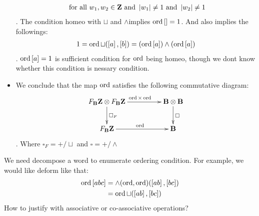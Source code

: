 \begin{itemize}
\begin{equation}
\begin{split}
			& \text{ for all }w_1,w_2\in {\mathbf{Z}}\text{ and }\left|{w_1}\right|\not=1 \text{ and }\left|{w_2}\right|\not=1 \\
	\end{split}\end{equation}
	. 
	The condition homeo with $\sqcup$ and $\wedge $implies $\operatorname{ord}\left[{}\right]=1$.
	And also implies the followings:
	\begin{equation}\begin{split}
		1 = \operatorname{ord}\sqcup(\left[{a}\right],\left[{b}\right]) 
			= (\operatorname{ord}\left[{a}\right]) \wedge (\operatorname{ord}\left[{a}\right])
	\end{split}\end{equation}
	. $\operatorname{ord}\left[{a}\right]=1$ is sufficient condition for $\operatorname{ord}$ being
	homeo, though we dont know whether this condition is nessary condition.
	\item We conclude that the map $\operatorname{ord}$ satisfies the following 
	commutative diagram:
	\begin{equation}\xymatrix@C+24pt{
		F_{\mybf{B}}\mybf{Z}\otimes F_{\mybf{B}}\mybf{Z} \ar[r]^{\myop{ord}\times\myop{ord}} \ar[d]^{\square_F}
		& \mybf{B}\otimes \mybf{B} \ar[d]^{\square}
		\\
		F_{\mybf{B}}\mybf{Z} \ar[r]^{\myop{ord}}
		& \mybf{B} 
		\\
	}\end{equation}
	. Where $\square_F=+/\sqcup$ and $\square=+/\wedge$
\end{itemize}

\begin{todo}[decomposition]
We need decompose a word to enumerate ordering condition.
For example, we would like deform like that:
\begin{equation}\begin{split}
	\operatorname{ord}\left[{abc}\right] 
		&= \wedge(\operatorname{ord}, \operatorname{ord})(\left[{ab}\right], \left[{bc}\right]) \\
		&= \operatorname{ord}\sqcup(\left[{ab}\right], \left[{bc}\right]) \\
\end{split}\end{equation}
How to justify with associative or co-associative operations?
\end{todo}
